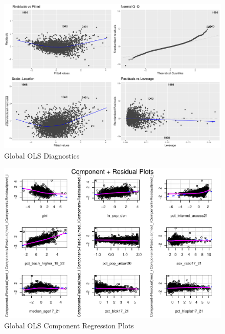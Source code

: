 \documentclass[
]{article}
\begin{document}
\begin{figure}[H]

{\centering \includegraphics{final-project-write-up-nathan-nguyen_files/figure-latex/unnamed-chunk-7-1} 

}

\caption{Global OLS Diagnostics}\label{fig:unnamed-chunk-7}
\end{figure}

\begin{figure}[H]

{\centering \includegraphics[width=1\linewidth]{final-project-write-up-nathan-nguyen_files/figure-latex/unnamed-chunk-8-1} 

}

\caption{Global OLS Component Regression Plots}\label{fig:unnamed-chunk-8}
\end{figure}
\end{document}
